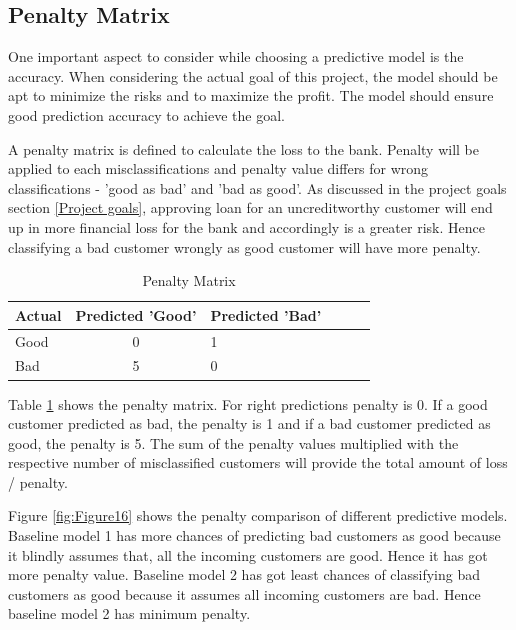 \documentclass[sigconf]{acmart}
\begin{document}
\subsection{Penalty Matrix} 

One important aspect to consider while choosing a predictive model is the accuracy. When considering the actual goal of this project, the model should be apt to minimize the risks and to maximize the profit. The model should ensure good prediction accuracy to achieve the goal. 

A penalty matrix is defined to calculate the loss to the bank. Penalty will be applied to each misclassifications and penalty value differs for wrong classifications - 'good as bad' and 'bad as good'. As discussed in the project goals section \ref{Project goals}, approving loan for an uncreditworthy customer will end up in more financial loss for the bank and accordingly is a greater risk. Hence classifying a bad customer wrongly as good customer will have more penalty.  

\begin{table}
  \caption{Penalty Matrix
  \cite{psu-site}}
  \label{tab:table12}
  \begin{tabular}{lclclc}
    \toprule
     Actual& Predicted 'Good'& Predicted 'Bad'\\
    \midrule
    Good& 0& 1\\
    Bad& 5& 0\\
    \bottomrule
  \end{tabular}
\end{table}

Table \ref{tab:table12} shows the penalty matrix. For right predictions penalty is 0. If a good customer predicted as bad, the penalty is 1 and if a bad customer predicted as good, the penalty is 5. The sum of the penalty values multiplied with the respective number of misclassified customers will provide the total amount of loss / penalty.

Figure \ref{fig:Figure16} shows the penalty comparison of different predictive models. Baseline model 1 has more chances of predicting bad customers as good because it blindly assumes that, all the incoming customers are good. Hence it has got more penalty value. Baseline model 2 has got least chances of classifying bad customers as good because it assumes all incoming customers are bad. Hence baseline model 2 has minimum penalty. 
\end{document}
